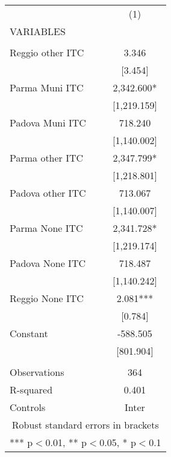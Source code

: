 \begin{tabular}{lc} \hline
 & (1) \\
VARIABLES &  \\ \hline
 &  \\
Reggio other ITC & 3.346 \\
 & [3.454] \\
Parma Muni ITC & 2,342.600* \\
 & [1,219.159] \\
Padova Muni ITC & 718.240 \\
 & [1,140.002] \\
Parma other ITC & 2,347.799* \\
 & [1,218.801] \\
Padova other ITC & 713.067 \\
 & [1,140.007] \\
Parma None ITC & 2,341.728* \\
 & [1,219.174] \\
Padova None ITC & 718.487 \\
 & [1,140.242] \\
Reggio None ITC & 2.081*** \\
 & [0.784] \\
Constant & -588.505 \\
 & [801.904] \\
 &  \\
Observations & 364 \\
R-squared & 0.401 \\
 Controls & Inter \\ \hline
\multicolumn{2}{c}{ Robust standard errors in brackets} \\
\multicolumn{2}{c}{ *** p$<$0.01, ** p$<$0.05, * p$<$0.1} \\
\end{tabular}
